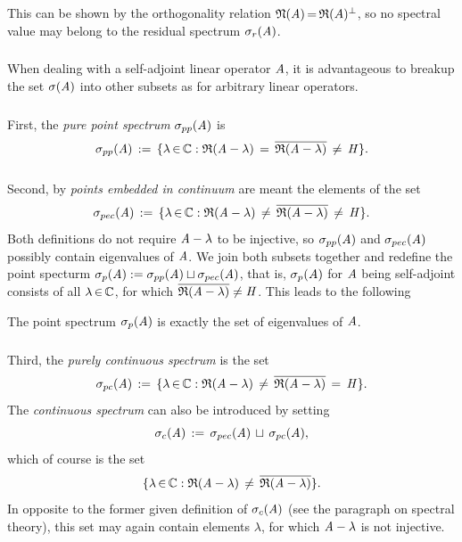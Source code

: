\documentclass[11pt,twoside]{article}
\begin{document}
\subparagraph*{}
This can be shown by the orthogonality relation 
$\mathfrak{N}(\mathit{A}) {\,=\,} \mathfrak{R}(A)^{\bot}$,
so no spectral value may belong to the residual spectrum $\sigma_r(\mathit{A})$.

\subsubsection*{} %
When dealing with a self-adjoint linear operator $\mathit{A}$,
it is advantageous to breakup the set $\sigma(\mathit{A})$
into other subsets as for arbitrary linear operators.

\subparagraph*{}
First,
the \textit{pure point spectrum} $\sigma_{pp}(\mathit{A})$ is
\[
\sigma_{pp}(\mathit{A}) \,:=\,
\{ \lambda {\,\in\,} {\mathbb{C}}:
\mathfrak{R}(\mathit{A} - \lambda) \,=\, \overline{\mathfrak{R}(\mathit{A} - \lambda) }
\, \neq \, \mathit{H} \}.
\]

\subparagraph*{}
Second,
by \textit{points embedded in continuum}
are meant the elements of the set
\[
\sigma_{pec}(\mathit{A}) \,:=\,
\{ \lambda {\,\in\,} {\mathbb{C}}:
\mathfrak{R}(\mathit{A} - \lambda) \, \neq \, \overline{\mathfrak{R}(\mathit{A} - \lambda) }
\, \neq \, \mathit{H}
\}.
\]
Both definitions do not require $\mathit{A}-\lambda$ to be injective,
so $\sigma_{pp}(\mathit{A})$ and $\sigma_{pec}(\mathit{A})$ 
possibly contain eigenvalues of $\mathit{A}$.
We join both subsets together and redefine the point specturm
$\sigma_p(\mathit{A}) := \sigma_{pp}(\mathit{A}) \sqcup \sigma_{pec}(\mathit{A})$,
that is,
$\sigma_p(\mathit{A})$ for $\mathit{A}$ being self-adjoint
consists of all $\lambda {\,\in\,} {\mathbb{C}}$,
for which $\overline{\mathfrak{R}(\mathit{A} - \lambda)} \neq \mathit{H}$.
This leads to the following

\begin{theorem}\label{POINT_SPECTRUM_IS_SET_OF_EIGENVALUES}
The point spectrum $\sigma_p(\mathit{A})$ is exactly
the set of eigenvalues of $\mathit{A}$.
\end{theorem}

\subparagraph*{}
Third,
the \textit{purely continuous spectrum} is the set
\[
\sigma_{pc}(\mathit{A}) \,:=\,
\{ \lambda {\,\in\,} {\mathbb{C}}:
\mathfrak{R}(\mathit{A} - \lambda) \, \neq \, \overline{\mathfrak{R}(\mathit{A} - \lambda) }
\,=\, \mathit{H} \}.
\]
The \textit{continuous spectrum} can also be introduced by setting
\[
\sigma_c(\mathit{A}) \,:=\, \sigma_{pec}(\mathit{A}) \, \sqcup \, \sigma_{pc}(\mathit{A}),
\]
which of course is the set 
\[
\{ \lambda {\,\in\,} {\mathbb{C}}:
\mathfrak{R}(\mathit{A} - \lambda) \, \neq \, \overline{\mathfrak{R}(\mathit{A} - \lambda) } \}.
\]
In opposite to the former given definition of $\sigma_c(\mathit{A})$
(see the paragraph on spectral theory),
this set may again contain elements $\lambda$,
for which $\mathit{A}-\lambda$ is not injective.
\end{document}
